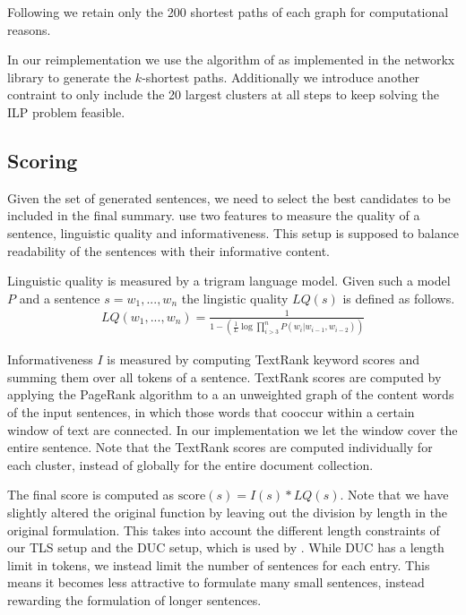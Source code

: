 \documentclass[a4paper,BCOR=10mm]{report}
\begin{document}
Following \citet{banerjee} we retain only the 200 shortest paths of each graph for computational reasons.

In our reimplementation we use the algorithm of \citet{kshortestpath} as implemented in the networkx library \citep{networkx} to generate the $k$-shortest paths. Additionally we introduce another contraint to only include the 20 largest clusters at all steps to keep solving the ILP problem feasible.

\subsection{Scoring}

Given the set of generated sentences, we need to select the best candidates to be included in the final summary. \citet{banerjee} use two features to measure the quality of a sentence, linguistic quality and informativeness. This setup is supposed to balance readability of the sentences with their informative content.

Linguistic quality is measured by a trigram language model. Given such a model $P$ and a sentence $s = w_1, ..., w_n$ the lingistic quality $LQ(s)$ is defined as follows.
\begin{align*}
LQ(w_1, ..., w_n) = \frac{1}{1 - (\frac{1}{L} \log \prod_{i > 3}^{n} P(w_i | w_{i - 1}, w_{i - 2}))}
\end{align*}

Informativeness $I$ is measured by computing TextRank \citet{textrank} keyword scores and summing them over all tokens of a sentence.
TextRank scores are computed by applying the PageRank \citet{pagerank} algorithm to a an unweighted graph of the content words of the input sentences, in which those words that cooccur within a certain window of text are connected.
In our implementation we let the window cover the entire sentence.
Note that the TextRank scores are computed individually for each cluster, instead of globally for the entire document collection.

The final score is computed as $\text{score}(s) = I(s) * LQ(s)$. Note that we have slightly altered the original function by leaving out the division by length in the original formulation. This takes into account the different length constraints of our TLS setup and the DUC setup, which is used by \citeauthor{banerjee}. While DUC has a length limit in tokens, we instead limit the number of sentences for each entry.
This means it becomes less attractive to formulate many small sentences, instead rewarding the formulation of longer sentences.
\end{document}
